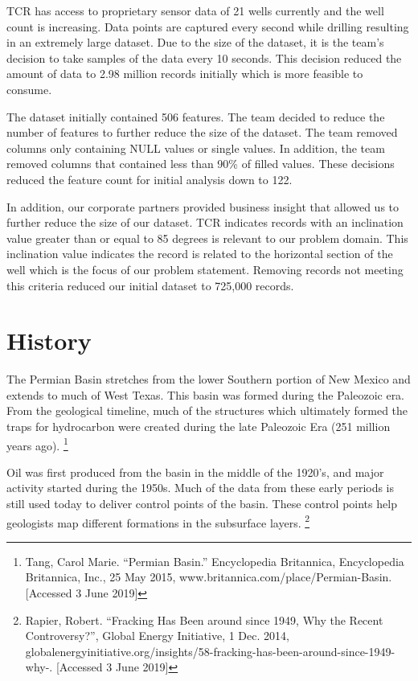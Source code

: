 \documentclass{llncs}
\begin{document}
TCR has access to proprietary sensor data of 21 wells currently and the well count is increasing. Data points are captured every second while drilling resulting in an extremely large dataset. Due to the size of the dataset, it is the team's decision to take samples of the data every 10 seconds. This decision reduced the amount of data to 2.98 million records initially which is more feasible to consume.

The dataset initially contained 506 features. The team decided to reduce the number of features to further reduce the size of the dataset. The team removed columns only containing NULL values or single values. In addition, the team removed columns that contained less than 90\% of filled values. These decisions reduced the feature count for initial analysis down to 122.

In addition, our corporate partners provided business insight that allowed us to further reduce the size of our dataset. TCR indicates records with an inclination value greater than or equal to 85 degrees is relevant to our problem domain. This inclination value indicates the record is related to the horizontal section of the well which is the focus of our problem statement. Removing records not meeting this criteria reduced our initial dataset to 725,000 records.

\section{History}
The Permian Basin stretches from the lower Southern portion of New Mexico and extends to much of West Texas. This basin was formed during the Paleozoic era. From the geological timeline, much of the structures which ultimately formed the traps for hydrocarbon were created during the late Paleozoic Era (251 million years ago).
\footnote[1] {Tang, Carol Marie. “Permian Basin.” Encyclopedia Britannica, Encyclopedia Britannica, Inc., 25 May 2015, www.britannica.com/place/Permian-Basin. [Accessed 3 June 2019]}

Oil was first produced from the basin in the middle of the 1920’s, and major activity started during the 1950s. Much of the data from these early periods is still used today to deliver control points of the basin. These control points help geologists map different formations in the subsurface layers.
\footnote[2] {Rapier, Robert. “Fracking Has Been around since 1949, Why the Recent Controversy?”, Global Energy Initiative, 1 Dec. 2014, globalenergyinitiative.org/insights/58-fracking-has-been-around-since-1949-why-. [Accessed 3 June 2019]}
\end{document}
